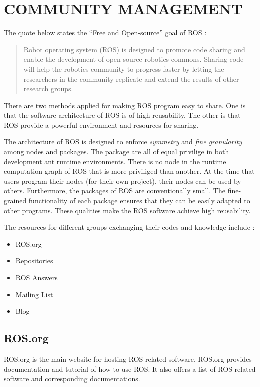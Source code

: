 \documentclass[a4paper, 10pt, conference]{ieeeconf}       %
\begin{document}
\section{COMMUNITY MANAGEMENT}

The quote below states the ``Free and Open-source'' goal of ROS\cite{cousins_sharing_2010} :
\begin{quote}
  Robot operating system (ROS) is designed to promote code sharing and enable the development of open-source robotics commons. Sharing code will help the robotics community to progress faster by letting the researchers in the community replicate and extend the results of other research groups. 
\end{quote}

There are two methods applied for making ROS program easy to share. One is that the software architecture of ROS is of high reusability. The other is that ROS provide a powerful environment and resources for sharing.

The architecture of ROS is designed to enforce \emph{symmetry} and \emph{fine granularity} among nodes and packages. The package are all of equal privilige in both development ant runtime environments. There is no node in the runtime computation graph of ROS that is more priviliged than another. At the time that users program their nodes (for their own project), their nodes can be used by others. Furthermore, the packages of ROS are conventionally small. The fine-grained functionality of each package ensures that they can be easily adapted to other programs. These qualities make the ROS software achieve high reusability.

The resources for different groups exchanging their codes and knowledge include :
\begin{itemize}
  \item ROS.org
  \item Repositories
  \item ROS Answers
  \item Mailing List
  \item Blog
\end{itemize}

\subsection{ROS.org}
ROS.org is the main website for hosting ROS-related software. ROS.org provides documentation and tutorial of how to use ROS. It also offers a list of ROS-related software and corresponding documentations. 
\end{document}

